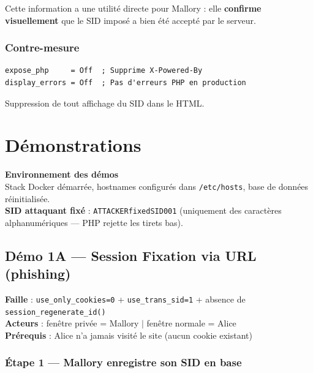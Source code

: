 \documentclass[12pt,a4paper]{report}
\newcommand{\sid}[1]{\texttt{\textcolor{primary-blue}{#1}}}
\begin{document}
Cette information a une utilité directe pour Mallory : elle \textbf{confirme visuellement} que le SID imposé a bien été accepté par le serveur.

\subsection{Contre-mesure}

\begin{securebox}
\begin{lstlisting}[caption={php.ini sécurisé}]
expose_php     = Off  ; Supprime X-Powered-By
display_errors = Off  ; Pas d'erreurs PHP en production
\end{lstlisting}
Suppression de tout affichage du SID dans le HTML.
\end{securebox}

\chapter{Démonstrations}

\begin{infobox}
\textbf{Environnement des démos} \\
Stack Docker démarrée, hostnames configurés dans \texttt{/etc/hosts}, base de données réinitialisée. \\
\textbf{SID attaquant fixé} : \sid{ATTACKERfixedSID001} (uniquement des caractères alphanumériques — PHP rejette les tirets bas).
\end{infobox}

\section{Démo 1A — Session Fixation via URL (phishing)}

\begin{demobox}
\textbf{Faille} : \texttt{use\_only\_cookies=0} + \texttt{use\_trans\_sid=1} + absence de \texttt{session\_regenerate\_id()} \\
\textbf{Acteurs} : fenêtre privée = Mallory $\mid$ fenêtre normale = Alice \\
\textbf{Prérequis} : Alice n'a jamais visité le site (aucun cookie existant)
\end{demobox}

\subsection*{Étape 1 — Mallory enregistre son SID en base}
\end{document}
